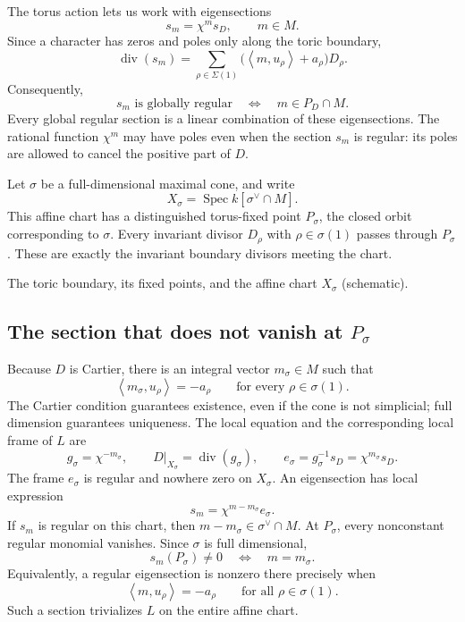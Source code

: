 \documentclass[11pt]{article}
\theoremstyle{definition}
\theoremstyle{remark}
\DeclareMathOperator{\divisor}{div}
\DeclareMathOperator{\Spec}{Spec}
\newcommand{\Sg}{\Sigma}
\newcommand{\braket}[2]{\left\langle #1,#2\right\rangle}
\newcommand{\toricchart}{%
    \draw[gray!65,thick] (0.7,0) ellipse[x radius=2.45,y radius=1.35];
    \node at (2.6,1.2) {$X_\Sg$};
    \draw[teal!65!black,thick]
        (-1.55,0.18) .. controls (-1.12,0.72) and (-0.65,0.64) .. (-0.55,0.64)
        .. controls (0.12,0.46) and (1.02,0.52) .. (1.5,0.82)
        .. controls (1.66,0.91) and (1.8,1.02) .. (1.92,1.12);
    \draw[teal!65!black,thick]
        (-0.95,1.08) .. controls (-0.84,0.9) and (-0.72,0.77) .. (-0.55,0.64)
        .. controls (0.04,0.13) and (1.15,-0.01) .. (2.04,-0.49)
        .. controls (2.32,-0.65) and (2.54,-0.94) .. (2.55,-1.13);
    \draw[teal!65!black,thick]
        (1.19,1.11) .. controls (1.31,1.01) and (1.43,0.92) .. (1.5,0.82)
        .. controls (1.82,0.48) and (1.83,-0.07) .. (2.04,-0.49)
        .. controls (2.15,-0.71) and (2.23,-0.94) .. (2.26,-1.1);
    \foreach \point in {(-0.55,0.64),(1.5,0.82),(2.04,-0.49)}
        \fill \point circle (1.7pt);
    \draw[dashed,thick,gray] (-0.66,-0.02) ellipse[x radius=0.99,y radius=1.14];
    \node[below] at (-0.65,-1.18) {$X_\sigma$};
    \node[above left] at (-0.55,0.64) {$P_\sigma$};
    \node[below left,text=teal!65!black] at (-1.22,0.38) {$D_{\rho_1}$};
    \node[above left,text=teal!65!black] at (-0.95,1.08) {$D_{\rho_2}$};
}
\begin{document}
The torus action lets us work with eigensections
\[
    s_m=\chi^m s_D,\qquad m\in M.
\]
Since a character has zeros and poles only along the toric boundary,
\[
    \divisor(s_m)=\sum_{\rho\in\Sg(1)}
        \bigl(\braket{m}{u_\rho}+a_\rho\bigr)D_\rho.
\]
Consequently,
\[
    s_m\text{ is globally regular}
    \quad\Longleftrightarrow\quad
    m\in P_D\cap M.
\]
Every global regular section is a linear combination of these
eigensections. The rational function \(\chi^m\) may have poles even
when the section \(s_m\) is regular: its poles are allowed to cancel
the positive part of \(D\).

Let \(\sigma\) be a full-dimensional maximal cone, and write
\[
    X_\sigma=\Spec k[\sigma^\vee\cap M].
\]
This affine chart has a distinguished torus-fixed point \(P_\sigma\),
the closed orbit corresponding to \(\sigma\). Every invariant divisor
\(D_\rho\) with \(\rho\in\sigma(1)\) passes through \(P_\sigma\).
These are exactly the invariant boundary divisors meeting the chart.

\Needspace{4cm}
\begin{center}

{\small The toric boundary, its fixed points, and the affine chart
\(X_\sigma\) (schematic).}
\end{center}

\subsection{The section that does not vanish at \(P_\sigma\)}

Because \(D\) is Cartier, there is an integral vector \(m_\sigma\in M\)
such that
\[
    \braket{m_\sigma}{u_\rho}=-a_\rho
    \qquad\text{for every }\rho\in\sigma(1).
\]
The Cartier condition guarantees existence, even if the cone is not
simplicial; full dimension guarantees uniqueness. The local equation
and the corresponding local frame of \(L\) are
\[
    g_\sigma=\chi^{-m_\sigma},\qquad
    D|_{X_\sigma}=\divisor(g_\sigma),\qquad
    e_\sigma=g_\sigma^{-1}s_D=\chi^{m_\sigma}s_D.
\]
The frame \(e_\sigma\) is regular and nowhere zero on \(X_\sigma\).
An eigensection has local expression
\[
    s_m=\chi^{m-m_\sigma}e_\sigma.
\]
If \(s_m\) is regular on this chart, then
\(m-m_\sigma\in\sigma^\vee\cap M\). At \(P_\sigma\), every nonconstant
regular monomial vanishes. Since \(\sigma\) is full dimensional,
\[
    \boxed{s_m(P_\sigma)\ne0\quad\Longleftrightarrow\quad m=m_\sigma.}
\]
Equivalently, a regular eigensection is nonzero there precisely when
\[
    \braket{m}{u_\rho}=-a_\rho
    \qquad\text{for all }\rho\in\sigma(1).
\]
Such a section trivializes \(L\) on the entire affine chart.
\end{document}
